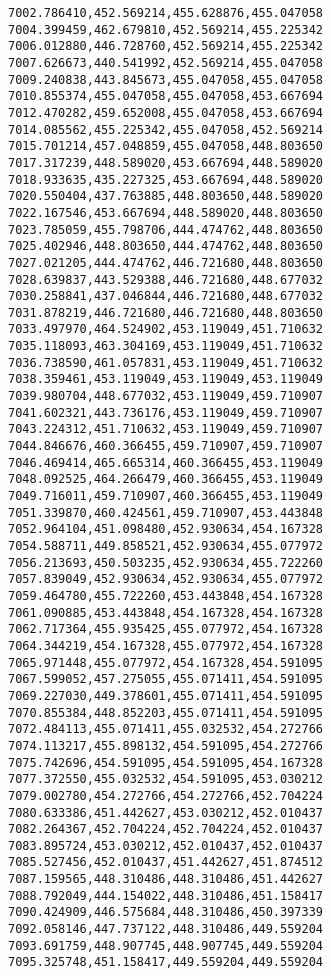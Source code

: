 \documentclass[11pt]{article}
\begin{document}
\begin{Verbatim}[commandchars=\\\{\}]
7002.786410,452.569214,455.628876,455.047058
7004.399459,462.679810,452.569214,455.225342
7006.012880,446.728760,452.569214,455.225342
7007.626673,440.541992,452.569214,455.047058
7009.240838,443.845673,455.047058,455.047058
7010.855374,455.047058,455.047058,453.667694
7012.470282,459.652008,455.047058,453.667694
7014.085562,455.225342,455.047058,452.569214
7015.701214,457.048859,455.047058,448.803650
7017.317239,448.589020,453.667694,448.589020
7018.933635,435.227325,453.667694,448.589020
7020.550404,437.763885,448.803650,448.589020
7022.167546,453.667694,448.589020,448.803650
7023.785059,455.798706,444.474762,448.803650
7025.402946,448.803650,444.474762,448.803650
7027.021205,444.474762,446.721680,448.803650
7028.639837,443.529388,446.721680,448.677032
7030.258841,437.046844,446.721680,448.677032
7031.878219,446.721680,446.721680,448.803650
7033.497970,464.524902,453.119049,451.710632
7035.118093,463.304169,453.119049,451.710632
7036.738590,461.057831,453.119049,451.710632
7038.359461,453.119049,453.119049,453.119049
7039.980704,448.677032,453.119049,459.710907
7041.602321,443.736176,453.119049,459.710907
7043.224312,451.710632,453.119049,459.710907
7044.846676,460.366455,459.710907,459.710907
7046.469414,465.665314,460.366455,453.119049
7048.092525,464.266479,460.366455,453.119049
7049.716011,459.710907,460.366455,453.119049
7051.339870,460.424561,459.710907,453.443848
7052.964104,451.098480,452.930634,454.167328
7054.588711,449.858521,452.930634,455.077972
7056.213693,450.503235,452.930634,455.722260
7057.839049,452.930634,452.930634,455.077972
7059.464780,455.722260,453.443848,454.167328
7061.090885,453.443848,454.167328,454.167328
7062.717364,455.935425,455.077972,454.167328
7064.344219,454.167328,455.077972,454.167328
7065.971448,455.077972,454.167328,454.591095
7067.599052,457.275055,455.071411,454.591095
7069.227030,449.378601,455.071411,454.591095
7070.855384,448.852203,455.071411,454.591095
7072.484113,455.071411,455.032532,454.272766
7074.113217,455.898132,454.591095,454.272766
7075.742696,454.591095,454.591095,454.167328
7077.372550,455.032532,454.591095,453.030212
7079.002780,454.272766,454.272766,452.704224
7080.633386,451.442627,453.030212,452.010437
7082.264367,452.704224,452.704224,452.010437
7083.895724,453.030212,452.010437,452.010437
7085.527456,452.010437,451.442627,451.874512
7087.159565,448.310486,448.310486,451.442627
7088.792049,444.154022,448.310486,451.158417
7090.424909,446.575684,448.310486,450.397339
7092.058146,447.737122,448.310486,449.559204
7093.691759,448.907745,448.907745,449.559204
7095.325748,451.158417,449.559204,449.559204

\end{Verbatim}
\end{document}

